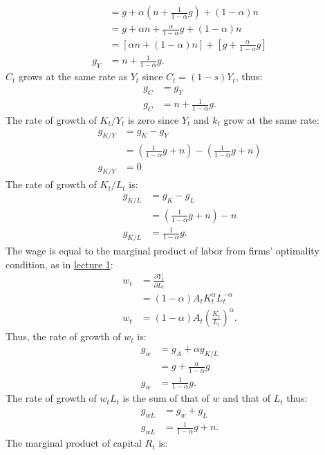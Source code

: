\documentclass[]{book}
\theoremstyle{definition}
\theoremstyle{definition}
\theoremstyle{definition}
\theoremstyle{remark}
\begin{document}
\begin{enumerate}
\[\begin{aligned}
  &= g+ \alpha\left(n+\frac{1}{1-\alpha}g\right)+(1-\alpha)n\\
  &= g+ \alpha n+\frac{\alpha}{1-\alpha}g+(1-\alpha)n \\
  &= \left[\alpha n+(1-\alpha)n\right] + \left[g+  \frac{\alpha}{1-\alpha}g\right] \\
  g_Y&=n+\frac{1}{1-\alpha}g.
  \end{aligned}
  \] \(C_t\) grows at the same rate as \(Y_t\) since \(C_t=(1-s)Y_t\),
  thus: \[
  \begin{aligned}
  g_C&=g_Y \\
  g_C&=n+\frac{1}{1-\alpha}g.
  \end{aligned}
  \] The rate of growth of \(K_t/Y_t\) is zero since \(Y_t\) and \(k_t\)
  grow at the same rate: \[
  \begin{aligned}
  g_{K/Y}&=g_K-g_Y\\
  &=\left(\frac{1}{1-\alpha}g + n\right)-\left(\frac{1}{1-\alpha}g + n\right)\\
  g_{K/Y}&=0
  \end{aligned}
  \] The rate of growth of \(K_t/L_t\) is: \[
  \begin{aligned}
  g_{K/L}&=g_K-g_L\\
  &= \left(\frac{1}{1-\alpha}g + n\right)-n \\
  g_{K/L}&=\frac{1}{1-\alpha}g.
  \end{aligned}
  \] The wage is equal to the marginal product of labor from firms'
  optimality condition, as in \protect\hyperlink{intro-cobb}{lecture 1}:
  \[
  \begin{aligned}
  w_t&=\frac{\partial Y_t}{\partial L_t}\\
  &=(1-\alpha)A_t K_t^\alpha L_t^{-\alpha}\\
  w_t&=(1-\alpha)A_t \left(\frac{K_t}{L_t}\right)^{\alpha}.
  \end{aligned}
  \] Thus, the rate of growth of \(w_t\) is: \[
  \begin{aligned}
  g_w&=g_A+\alpha g_{K/L}\\
  &=g+\frac{\alpha}{1-\alpha}g\\
  g_w&=\frac{1}{1-\alpha}g.
  \end{aligned}
  \] The rate of growth of \(w_t L_t\) is the sum of that of \(w\) and
  that of \(L_t\) thus: \[
  \begin{aligned}
  g_{wL}&=g_w + g_L \\
  g_{wL}&=\frac{1}{1-\alpha}g+n.
  \end{aligned}
  \] The marginal product of capital \(R_t\) is: \[
\]
\end{enumerate}
\end{document}
